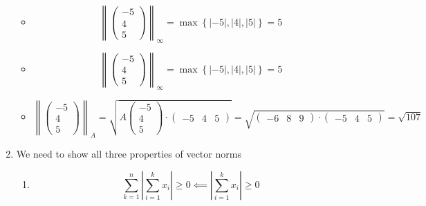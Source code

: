 \documentclass{article}
\newcommand*{\mat}[1]{\begin{pmatrix}#1\end{pmatrix}}
\begin{document}
\begin{enumerate}
{\begin{itemize}
{\begin{displaymath}
                    \end{displaymath}
                }
                \item {
                    \begin{displaymath}
                        \left\|\mat{-5\\4\\5}\right\|_\infty = \max\left\{|-5|,|4|,|5|\right\} = 5
                    \end{displaymath}
                }
                \item {
                    \begin{displaymath}
                        \left\|\mat{-5\\4\\5}\right\|_\infty = \max\left\{|-5|,|4|,|5|\right\} = 5
                    \end{displaymath}
                }
                \item {
                    \begin{displaymath}
                        \left\|\mat{-5\\4\\5}\right\|_A = \sqrt{A\mat{-5\\4\\5}\cdot\mat{-5 & 4 & 5}} = \sqrt{\mat{-6 & 8 & 9}\cdot\mat{-5 & 4 & 5}} = \sqrt{107}
                    \end{displaymath}
                }
            \end{itemize}
        }
        \item {
            We need to show all three properties of vector norms
            \begin{enumerate}[label={\text{property }\arabic*}]
                \item {
                    \begin{displaymath}
                        \sum_{k=1}^n\left|\sum_{i=1}^k x_i\right| \geq 0 \impliedby
                        \left|\sum_{i=1}^k x_i\right| \geq 0
                    \end{displaymath}

}
\end{enumerate}}
\end{enumerate}
\end{document}
